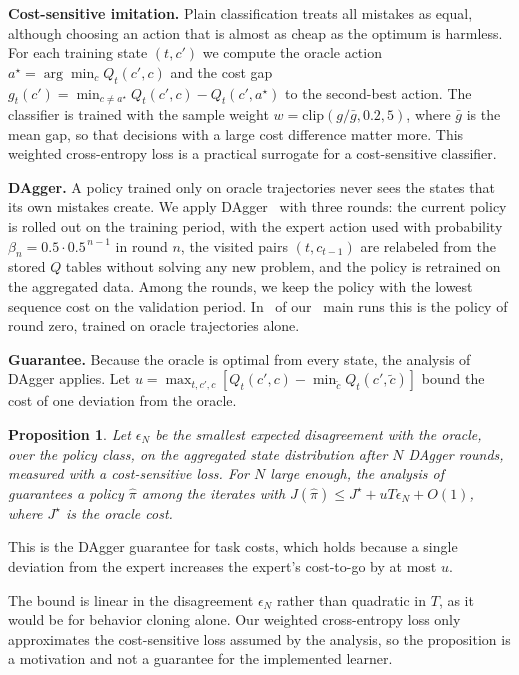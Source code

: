 \documentclass[journal]{IEEEtran}
\newtheorem{proposition}{Proposition}
\begin{document}
\textbf{Cost-sensitive imitation.} Plain classification treats all mistakes as equal, although choosing an action that is almost as cheap as the optimum is harmless. For each training state $(t,c')$ we compute the oracle action $a^\star=\arg\min_c Q_t(c',c)$ and the cost gap $g_t(c')=\min_{c\neq a^\star}Q_t(c',c)-Q_t(c',a^\star)$ to the second-best action. The classifier is trained with the sample weight $w=\mathrm{clip}(g/\bar g,0.2,5)$, where $\bar g$ is the mean gap, so that decisions with a large cost difference matter more. This weighted cross-entropy loss is a practical surrogate for a cost-sensitive classifier.

\textbf{DAgger.} A policy trained only on oracle trajectories never sees the states that its own mistakes create. We apply DAgger~\cite{ross2011dagger} with three rounds: the current policy is rolled out on the training period, with the expert action used with probability $\beta_n=0.5\cdot0.5^{\,n-1}$ in round $n$, the visited pairs $(t,c_{t-1})$ are relabeled from the stored $Q$ tables without solving any new problem, and the policy is retrained on the aggregated data. Among the rounds, we keep the policy with the lowest sequence cost on the validation period. In \daggerRoundZero\ of our \daggerRuns\ main runs this is the policy of round zero, trained on oracle trajectories alone.

\textbf{Guarantee.} Because the oracle is optimal from every state, the analysis of DAgger applies. Let $u=\max_{t,c',c}[Q_t(c',c)-\min_{\tilde c}Q_t(c',\tilde c)]$ bound the cost of one deviation from the oracle.

\begin{proposition}\label{prop:imitation}
Let $\epsilon_N$ be the smallest expected disagreement with the oracle, over the policy class, on the aggregated state distribution after $N$ DAgger rounds, measured with a cost-sensitive loss. For $N$ large enough, the analysis of~\cite{ross2011dagger} guarantees a policy $\hat\pi$ among the iterates with $J(\hat\pi)\le J^\star+uT\epsilon_N+O(1)$, where $J^\star$ is the oracle cost.
\end{proposition}
\begin{IEEEproof}
This is the DAgger guarantee for task costs, which holds because a single deviation from the expert increases the expert's cost-to-go by at most $u$.
\end{IEEEproof}

The bound is linear in the disagreement $\epsilon_N$ rather than quadratic in $T$, as it would be for behavior cloning alone. Our weighted cross-entropy loss only approximates the cost-sensitive loss assumed by the analysis, so the proposition is a motivation and not a guarantee for the implemented learner.
\end{document}
